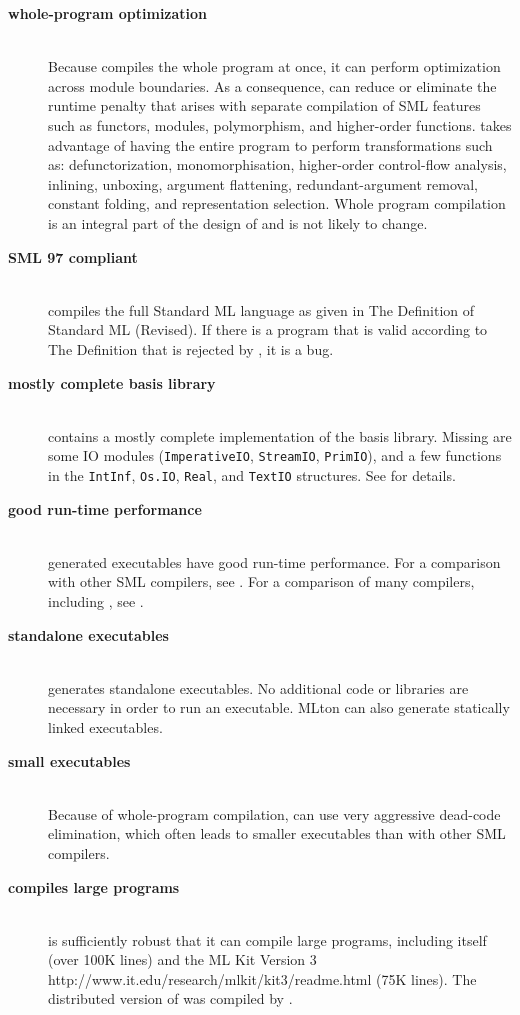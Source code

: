
\newcommand{\feature}[1]{\item[\bf #1]\hspace{1in}\\}
\begin{description}
\feature{whole-program optimization}
Because {\mlton} compiles the whole program at once, it can perform optimization
across module boundaries.  As a consequence, {\mlton} can reduce or eliminate
the runtime penalty that arises with separate compilation of SML features such
as functors, modules, polymorphism, and higher-order functions.  {\mlton} takes
advantage of having the entire program to perform transformations such as:
defunctorization, monomorphisation, higher-order control-flow analysis,
inlining, unboxing, argument flattening, redundant-argument removal, constant
folding, and representation selection.  Whole program compilation is an integral
part of the design of {\mlton} and is not likely to change.

\feature{SML 97 compliant}
{\mlton} compiles the full Standard ML language as given in The
Definition of Standard ML (Revised)\cite{MTHM97}.  If there is a
program that is valid according to The Definition that is rejected by
{\mlton}, it is a bug.

\feature{mostly complete basis library}
{\mlton} contains a mostly complete implementation of the basis library.
Missing are some IO modules ({\tt ImperativeIO}, {\tt StreamIO},
{\tt PrimIO}), and a few functions in the {\tt IntInf}, {\tt Os.IO}, {\tt Real},
and {\tt TextIO} structures.  See  for details.

\feature{good run-time performance}
{\mlton} generated executables have good run-time performance.
For a comparison with other SML compilers, see
.
For a comparison of many compilers, including {\mlton}, see
.

\feature{standalone executables}
{\mlton} generates standalone executables.  No additional code or
libraries are necessary in order to run an executable.  MLton can also generate
statically linked executables.

\feature{small executables}
Because of whole-program compilation, {\mlton} can use very aggressive 
dead-code elimination, which often leads to smaller executables than
with other SML compilers.

\feature{compiles large programs}
{\mlton} is sufficiently robust that it can compile large programs,
including itself (over 100K lines) and the
\htmladdnormallink
  {ML Kit Version 3}
  {http://www.it.edu/research/mlkit/kit3/readme.html}
(75K lines).
The distributed version of {\mlton} was compiled by {\mlton}.


\end{description}
